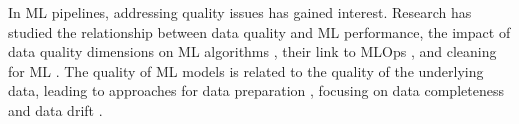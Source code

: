 
In ML pipelines, addressing quality issues has gained interest. Research has studied the relationship between data quality and ML performance, the impact of data quality dimensions on ML algorithms \cite{Budach2022TheEO}, their link to MLOps \cite{renggli2021data,Xin2021ProductionML}, and cleaning for ML \cite{DBLP:journals/corr/abs-1904-09483, krishnan2016activeclean}. The quality of ML models is related to the quality of the underlying data, leading to approaches for data preparation \cite{gupta2021data, Foroni2021EstimatingTE}, focusing on data completeness \cite{karlavs2020nearest, schelter2020learning} and data drift \cite{tahmasbi2020driftsurf,concept-drift-96}.

